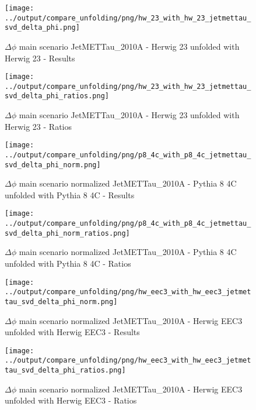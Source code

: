 \documentclass[11pt]{book}
\begin{document}
\begin{figure}[ht]
\centering
\texttt{[image: ../output/compare\_unfolding/png/hw\_23\_with\_hw\_23\_jetmettau\_svd\_delta\_phi.png]}
\caption{$\Delta\phi$ main scenario JetMETTau\_2010A - Herwig 23 unfolded with Herwig 23 - Results}
\label{hw_23_hw_23_jetmettau_svd_delta_phi_a}
\end{figure}

\begin{figure}[ht]
\centering
\texttt{[image: ../output/compare\_unfolding/png/hw\_23\_with\_hw\_23\_jetmettau\_svd\_delta\_phi\_ratios.png]}
\caption{$\Delta\phi$ main scenario JetMETTau\_2010A - Herwig 23 unfolded with Herwig 23 - Ratios}
\label{hw_23_jetmettau_svd_delta_phi_b}
\end{figure}


\begin{figure}[ht]
\centering
\texttt{[image: ../output/compare\_unfolding/png/p8\_4c\_with\_p8\_4c\_jetmettau\_svd\_delta\_phi\_norm.png]}
\caption{$\Delta\phi$ main scenario normalized JetMETTau\_2010A - Pythia 8 4C unfolded with Pythia 8 4C - Results}
\label{p8_p8_jetmettau_svd_delta_phi_norm_a}
\end{figure}

\begin{figure}[ht]
\centering
\texttt{[image: ../output/compare\_unfolding/png/p8\_4c\_with\_p8\_4c\_jetmettau\_svd\_delta\_phi\_norm\_ratios.png]}
\caption{$\Delta\phi$ main scenario normalized JetMETTau\_2010A - Pythia 8 4C unfolded with Pythia 8 4C - Ratios}
\label{p8_p8_jetmettau_svd_delta_phi_norm_b}
\end{figure}

\begin{figure}[ht]
\centering
\texttt{[image: ../output/compare\_unfolding/png/hw\_eec3\_with\_hw\_eec3\_jetmettau\_svd\_delta\_phi\_norm.png]}
\caption{$\Delta\phi$ main scenario normalized JetMETTau\_2010A - Herwig EEC3 unfolded with Herwig EEC3 - Results}
\label{hw_eec3_hw_eec3_jetmettau_svd_delta_phi_norm_a}
\end{figure}

\begin{figure}[ht]
\centering
\texttt{[image: ../output/compare\_unfolding/png/hw\_eec3\_with\_hw\_eec3\_jetmettau\_svd\_delta\_phi\_ratios.png]}
\caption{$\Delta\phi$ main scenario normalized JetMETTau\_2010A - Herwig EEC3 unfolded with Herwig EEC3 - Ratios}
\label{hw_eec3_jetmettau_svd_delta_phi_norm_b}
\end{figure}
\end{document}

